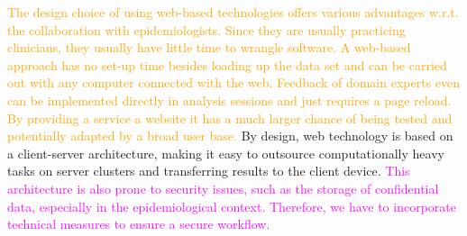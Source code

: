\documentclass[journal]{style/vgtc} 			          %
\newcommand{\design}[1]{\textcolor{orange}{#1}}
\newcommand{\magenta}[1]{\textcolor{magenta}{#1}}
\begin{document}
\design{
The design choice of using web-based technologies offers various advantages w.r.t. the collaboration with epidemiologists.
Since they are usually practicing clinicians, they usually have little time to wrangle software.
A web-based approach has no set-up time besides loading up the data set and can be carried out with any computer connected with the web.
Feedback of domain experts even can be implemented directly in analysis sessions and just requires a page reload.
By providing a service a website it has a much larger chance of being tested and potentially adapted by a broad user base.
}
By design, web technology is based on a client-server architecture, making it easy to outsource computationally heavy tasks on server clusters and transferring results to the client device.
\magenta{
This architecture is also prone to security issues, such as the storage of confidential data, especially in the epidemiological context.
Therefore, we have to incorporate technical measures to ensure a secure workflow.
}
\end{document}

